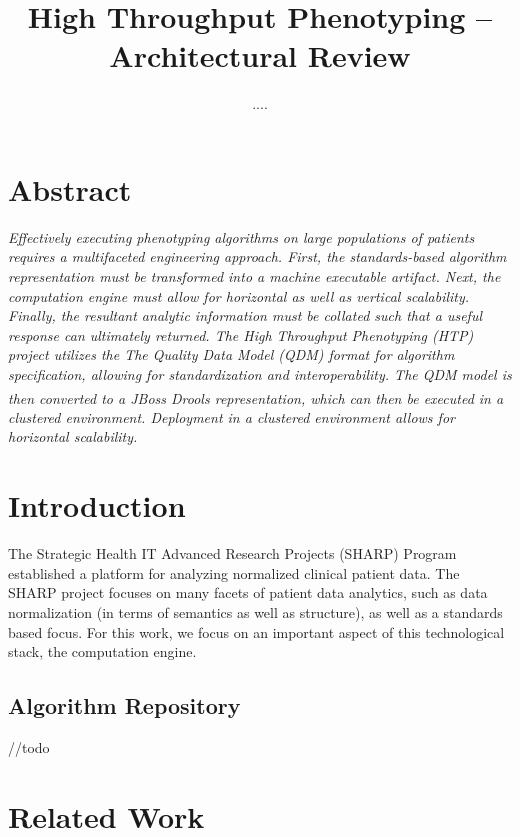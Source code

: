 \documentclass{amia}
\begin{document}
\title{High Throughput Phenotyping -- Architectural Review}

\author{ 
     ....
}


\maketitle

\section*{Abstract}

\textit{Effectively executing phenotyping algorithms on large populations of patients requires a multifaceted engineering approach. First, the standards-based algorithm representation must be transformed into a machine executable artifact. Next, the computation engine must allow for horizontal as well as vertical scalability. Finally, the resultant analytic information must be collated such that a useful response can ultimately returned. The High Throughput Phenotyping (HTP) project utilizes the The Quality Data Model (QDM) format for algorithm specification, allowing for standardization and interoperability. The QDM model is then converted to a JBoss{\textsuperscript{\textregistered}} Drools representation, which can then be executed in a clustered environment. Deployment in a clustered environment allows for horizontal scalability.}

\section*{Introduction}
The Strategic Health IT Advanced Research Projects (SHARP) Program established a platform for analyzing normalized clinical patient data\cite{pathak2013normalization,rea2012building}. The SHARP project focuses on many facets of patient data analytics, such as data normalization (in terms of semantics as well as structure), as well as a standards based focus. For this work, we focus on an important aspect of this technological stack, the computation engine.

\subsection*{Algorithm Repository}
//todo
\section*{Related Work}
\end{document}
